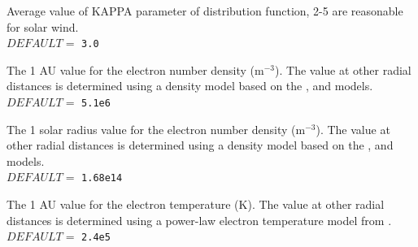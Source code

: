 \documentclass[12pt,a4paper]{article}
\begin{document}
  \vspace{0.5cm}

  \setlength{\temptextwidth}{\textwidth}   
  \addtolength{\temptextwidth}{-1.0\parindent} 
    
    \parbox[t]{\temptextwidth}{Average value of KAPPA parameter of
                               distribution  function, 2-5 are reasonable
                               for solar wind. \\
                               $DEFAULT=$ {\tt 3.0}} 

  \vspace{0.5cm}

  \setlength{\temptextwidth}{\textwidth}  
  \addtolength{\temptextwidth}{-1.0\parindent} 
    
  \parbox[t]{\temptextwidth}{The 1 AU value for the electron number density 
                             (m$^{-3}$). The value at other radial distances 
                             is determined using a density model based on the
                             \citet{saitoetal77}, 
                             and \citet{rc98c} models. \\ 
                             $DEFAULT=$ {\tt 5.1e6}}

  \vspace{0.5cm}

  \setlength{\temptextwidth}{\textwidth}  
  \addtolength{\temptextwidth}{-1.0\parindent} 
    
    \parbox[t]{\temptextwidth}{The 1 solar radius value for the electron number 
                               density (m$^{-3}$). The value at other radial 
                               distances 
                               is determined using a density model based on the
                               \citet{saitoetal77}, 
                               and \citet{rc98c} models. \\
                               $DEFAULT=$ {\tt 1.68e14}}

  \vspace{0.5cm}

  \setlength{\temptextwidth}{\textwidth}  
  \addtolength{\temptextwidth}{-1.0\parindent} 
  
    \parbox[t]{\temptextwidth}{The 1 AU value for the electron temperature (K). 
                               The value at other radial distances 
                               is determined using a power-law electron temperature 
                               model from \citet{rc98c}. \\  
                               $DEFAULT=$ {\tt 2.4e5}}
\end{document}
